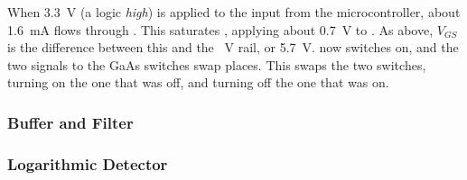 When 3.3~V (a logic \emph{high}) is applied to the input from the
microcontroller, about 1.6~mA flows through . This
saturates , applying about 0.7~V to . As above,
$V_{GS}$ is the difference between this and the ~V rail, or
5.7~V.  now switches on, and the two signals to the GaAs
switches swap places. This swaps the two switches, turning on the one that was
off, and turning off the one that was on.


\subsubsection{Buffer and Filter}

\subsubsection{Logarithmic Detector}
